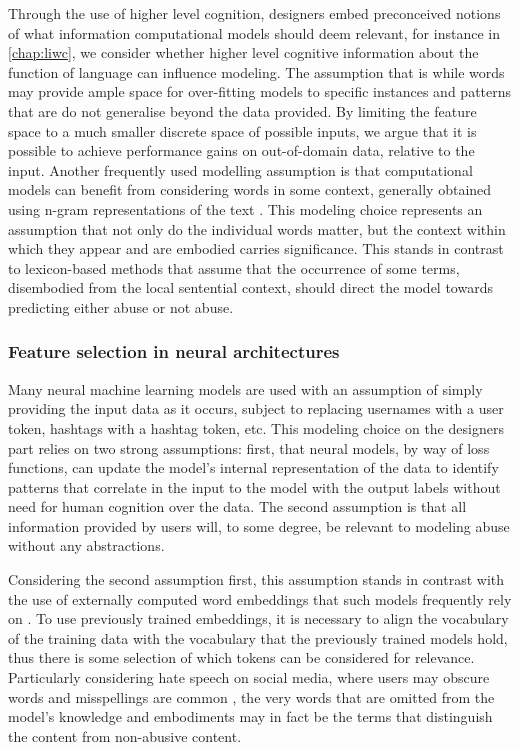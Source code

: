 Through the use of higher level cognition, designers embed preconceived notions of what information computational models should deem relevant, for instance in \autoref{chap:liwc}, we consider whether higher level cognitive information about the function of language can influence modeling. The assumption that is while words may provide ample space for over-fitting models to specific instances and patterns that are do not generalise beyond the data provided. By limiting the feature space to a much smaller discrete space of possible inputs, we argue that it is possible to achieve performance gains on out-of-domain data, relative to the input.
Another frequently used modelling assumption is that computational models can benefit from considering words in some context, generally obtained using n-gram representations of the text \citep{Waseem-Hovy:2016,Davidson:2017,Chiril:2020}. This modeling choice represents an assumption that not only do the individual words matter, but the context within which they appear and are embodied carries significance. This stands in contrast to lexicon-based methods \cite{Hurtlex:2019} that assume that the occurrence of some terms, disembodied from the local sentential context, should direct the model towards predicting either abuse or not abuse.

\subsubsection{Feature selection in neural architectures}

Many neural machine learning models are used with an assumption of simply providing the input data as it occurs, subject to replacing usernames with a user token, hashtags with a hashtag token, etc. This modeling choice on the designers part relies on two strong assumptions: first, that neural models, by way of loss functions, can update the model's internal representation of the data to identify patterns that correlate in the input to the model with the output labels without need for human cognition over the data. The second assumption is that all information provided by users will, to some degree, be relevant to modeling abuse without any abstractions.

Considering the second assumption first, this assumption stands in contrast with the use of externally computed word embeddings that such models frequently rely on \cite{Ksirsagar:2018,Isaksen:2020}. To use previously trained embeddings, it is necessary to align the vocabulary of the training data with the vocabulary that the previously trained models hold, thus there is some selection of which tokens can be considered for relevance. Particularly considering hate speech on social media, where users may obscure words and misspellings are common \cite{Rottger:2021}, the very words that are omitted from the model's knowledge and embodiments may in fact be the terms that distinguish the content from non-abusive content.

